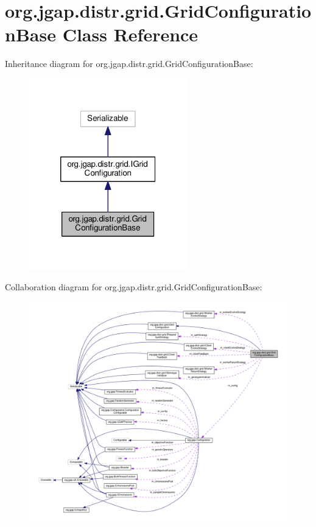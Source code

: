 \hypertarget{classorg_1_1jgap_1_1distr_1_1grid_1_1_grid_configuration_base}{\section{org.\-jgap.\-distr.\-grid.\-Grid\-Configuration\-Base Class Reference}
\label{classorg_1_1jgap_1_1distr_1_1grid_1_1_grid_configuration_base}
}


Inheritance diagram for org.\-jgap.\-distr.\-grid.\-Grid\-Configuration\-Base\-:
\nopagebreak
\begin{figure}[H]
\begin{center}
\leavevmode
\includegraphics[width=194pt]{classorg_1_1jgap_1_1distr_1_1grid_1_1_grid_configuration_base__inherit__graph}
\end{center}
\end{figure}


Collaboration diagram for org.\-jgap.\-distr.\-grid.\-Grid\-Configuration\-Base\-:
\nopagebreak
\begin{figure}[H]
\begin{center}
\leavevmode
\includegraphics[width=350pt]{classorg_1_1jgap_1_1distr_1_1grid_1_1_grid_configuration_base__coll__graph}
\end{center}
\end{figure}
